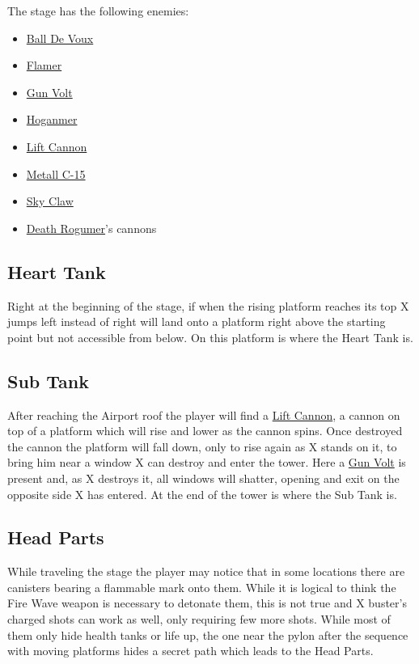 The stage has the following enemies\cite{wiki:Airport}:
\begin{itemize}
	\item \hyperlink{enem:Ball_De_Voux}{Ball De Voux }
	\item \hyperlink{enem:Flamer}{Flamer}
	\item \hyperlink{enem:Gun_Volt}{Gun Volt}
	\item \hyperlink{enem:Hoganmer}{Hoganmer}
	\item \hyperlink{enem:Lift Cannon}{Lift Cannon}
	\item \hyperlink{enem:Metall_C-15}{Metall C-15}
	\item \hyperlink{enem:Sky_Claw}{Sky Claw}
	\item \hyperlink{veichle:Death Rogumer}{Death Rogumer}'s cannons
\end{itemize}

\subsection{Heart Tank}
Right at the beginning of the stage, if when the rising platform reaches its top X jumps left instead of right will land onto a platform right above the starting point but not accessible from below. On this platform is where the Heart Tank is.

\subsection{Sub Tank}
After reaching the Airport roof the player will find a 	\hyperlink{enem:Lift_cannon}{Lift Cannon}, a cannon on top of a platform which will rise and lower as the cannon spins. Once destroyed the cannon the platform will fall down, only to rise again as X stands on it, to bring him near a window X can destroy and enter the tower. Here a \hyperlink{enem:Gun_Volt}{Gun Volt} is present and, as X destroys it, all windows will shatter, opening and exit on the opposite side X has entered. At the end of the tower is where the Sub Tank is. 
 
\subsection{Head Parts} 
 While traveling the stage the player may notice that in some locations there are canisters bearing a flammable mark onto them. While it is logical to think the Fire Wave weapon is necessary to detonate them, this is not true and X buster's charged shots can work as well, only requiring few more shots. While most of them only hide health tanks or life up, the one near the pylon after the sequence with moving platforms hides a secret path which leads to the Head Parts. 

